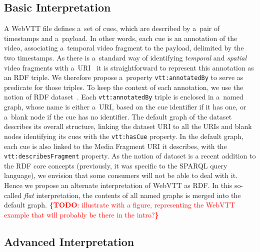 \documentclass{sig-alternate}
\newcommand{\todo}[1]{\noindent\textcolor{red}{{\bf \{TODO}: #1{\bf \}}}}
\newcommand{\vtt}[1]{\texttt{vtt:#1}}
\begin{document}
\subsection{Basic Interpretation}

A WebVTT file defines a~set of cues,
which are described by a~pair of timestamps and a~payload.
In other words, each cue is an annotation of the video,
associating a~temporal video fragment to the payload,
delimited by the two timestamps.
As there is a~standard way of identifying \emph{temporal}
and \emph{spatial} video fragments
with a~URI~\cite{troncy2012mediafragments}
it is straightforward to represent this annotation as an RDF triple.
We therefore propose a~property \vtt{annotatedBy}
to serve as predicate for those triples.
To keep the context of each annotation,
we use the notion of RDF dataset~\cite{cyganiak2014rdf11concepts}.
Each \vtt{annotatedBy} triple is enclosed in a~named graph,
whose name is either a~URI, based on the cue identifier if it has one,
or a~blank node if the cue has no identifier.
The default graph of the dataset describes its overall structure,
linking the dataset URI to all the URIs and blank nodes identifying its cues
with the \vtt{hasCue} property.
In the default graph, each cue is also linked to
the Media Fragment URI it describes,
with the \vtt{describesFragment} property. 
As the notion of dataset is a recent addition to the RDF core concepts
(previously, it was specific to the SPARQL query language),
we envision that some consumers will not be able to deal with it.
Hence we propose an alternate interpretation of WebVTT as RDF.
In this so-called \emph{flat} interpretation,
the contents of all named graphs is merged into the default graph.
\todo{illustrate with a figure, representing the WebVTT example that will probably be there in the intro?}

\subsection{Advanced Interpretation}
\end{document}
